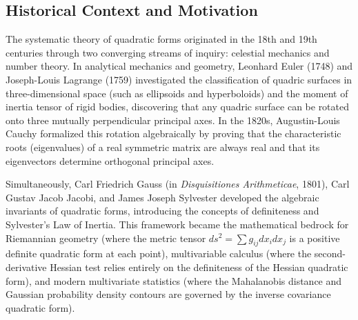 \documentclass[11pt, letterpaper]{article}
\theoremstyle{definition}
\theoremstyle{remark}
\begin{document}
\begin{center}
\end{center}

\subsection{Historical Context and Motivation}
The systematic theory of quadratic forms originated in the 18th and 19th centuries through two converging streams of inquiry: celestial mechanics and number theory. In analytical mechanics and geometry, Leonhard Euler (1748) and Joseph-Louis Lagrange (1759) investigated the classification of quadric surfaces in three-dimensional space (such as ellipsoids and hyperboloids) and the moment of inertia tensor of rigid bodies, discovering that any quadric surface can be rotated onto three mutually perpendicular principal axes. In the 1820s, Augustin-Louis Cauchy formalized this rotation algebraically by proving that the characteristic roots (eigenvalues) of a real symmetric matrix are always real and that its eigenvectors determine orthogonal principal axes.

Simultaneously, Carl Friedrich Gauss (in \textit{Disquisitiones Arithmeticae}, 1801), Carl Gustav Jacob Jacobi, and James Joseph Sylvester developed the algebraic invariants of quadratic forms, introducing the concepts of definiteness and Sylvester's Law of Inertia. This framework became the mathematical bedrock for Riemannian geometry (where the metric tensor $ds^2 = \sum g_{ij} dx_i dx_j$ is a positive definite quadratic form at each point), multivariable calculus (where the second-derivative Hessian test relies entirely on the definiteness of the Hessian quadratic form), and modern multivariate statistics (where the Mahalanobis distance and Gaussian probability density contours are governed by the inverse covariance quadratic form).
\end{document}
